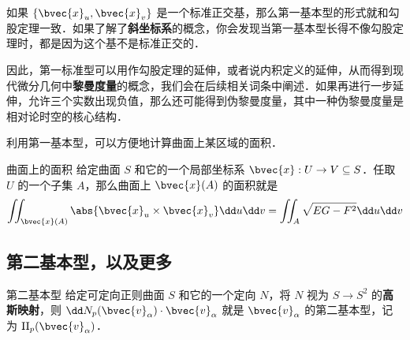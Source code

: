 如果 $\{\bvec{x}_u, \bvec{x}_v\}$ 是一个标准正交基，那么第一基本型的形式就和勾股定理一致．如果了解了\textbf{斜坐标系}的概念，你会发现当第一基本型长得不像勾股定理时，都是因为这个基不是标准正交的．

因此，第一标准型可以用作勾股定理的延伸，或者说内积定义的延伸，从而得到现代微分几何中\textbf{黎曼度量}的概念，我们会在后续相关词条中阐述．如果再进行一步延伸，允许三个实数出现负值，那么还可能得到伪黎曼度量，其中一种伪黎曼度量是相对论时空的核心结构．

利用第一基本型，可以方便地计算曲面上某区域的面积．

\begin{theorem}{曲面上的面积}
给定曲面 $S$ 和它的一个局部坐标系 $\bvec{x}:U\to V\subseteq S$．任取 $U$ 的一个子集 $A$，那么曲面上 $\bvec{x}(A)$ 的面积就是
\begin{equation}
\iint_{\bvec{x}(A)}\abs{\bvec{x}_u\times\bvec{x}_v}\dd u\dd v=\iint_{A}\sqrt{EG-F^2} \dd u\dd v
\end{equation}
\end{theorem}


\subsection{第二基本型，以及更多}

\begin{definition}{第二基本型}
给定可定向正则曲面 $S$ 和它的一个定向 $N$，将 $N$ 视为 $S\to S^2$ 的\textbf{高斯映射}，则 $\dd N_p(\bvec{v}_\alpha)\cdot \bvec{v}_\alpha$ 就是 $\bvec{v}_\alpha$ 的第二基本型，记为 $\mathrm{II}_p(\bvec{v}_\alpha)$．
\end{definition}

